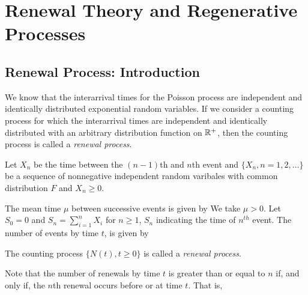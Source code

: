 \documentclass[all-lectures.tex]{subfiles}
\author{}
\begin{document}
\setcounter{chapter}{1}
\chapter{Renewal Theory and Regenerative Processes}

\setcounter{section}{0}
\section*{}
\chr
\section{Renewal Process: Introduction}
We know that the interarrival times for the Poisson process are independent and identically distributed exponential random variables.
If we consider a counting process for which the interarrival times are independent and identically distributed with an arbitrary distribution function on $\mathbb{R}^+$, then the counting process is called a \textit{renewal process}.

Let $X_n$ be the time between the $(n-1)$th and $n$th event and $\{X_n,n=1,2,\dots\}$ be a sequence of nonnegative independent random varibales with common distribution $F$ and $X_n \ge 0$.

The mean time $\mu$ between successive events is given by
We take $\mu > 0$. Let $S_0=0$ and $S_n = \sum_{i=1}^{n} X_i$ for $n \ge 1$, $S_n$ indicating the time of $n^{th}$ event.
The number of events by time $t$, is given by

\begin{defn}
The counting process $\{ N(t),t \ge 0\}$ is called a \textit{renewal process}.
\end{defn}

Note that the number of renewals by time $t$ is greater than or equal to $n$ if, and only if, the $n$th renewal occurs before or at time $t$.
That is,
\end{document}
